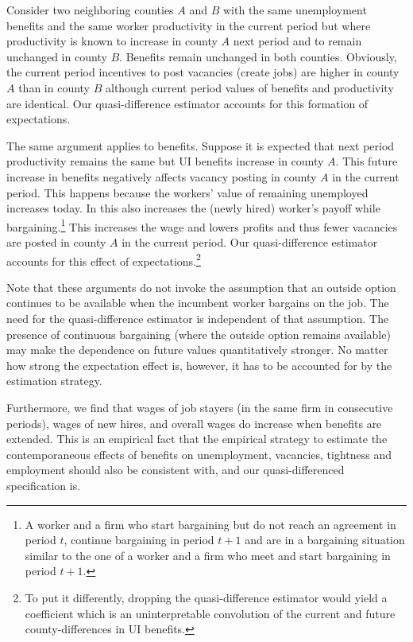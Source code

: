 \documentclass[12pt]{article}
\newcommand{\1}{\mathbf{1}}
\begin{document}
\begin{appendix}
Consider two neighboring counties $A$ and $B$ with the same unemployment benefits and the same worker productivity in the current period but where productivity is known to increase in county $A$ next period and to remain unchanged in county $B$. Benefits remain unchanged in both counties. Obviously, the current period incentives to post vacancies (create jobs) are higher in county $A$ than in county $B$ although current period values of benefits and productivity are identical. Our quasi-difference estimator accounts for this formation of expectations.

The same argument applies to benefits. Suppose it is expected that next period productivity remains the same but UI benefits increase in county $A$. This future increase in benefits negatively affects vacancy posting in county $A$ in the current period. This happens because the workers' value of remaining unemployed increases today. In \citet{hall+milgrom:08} this also increases the (newly hired) worker's payoff while bargaining.\footnote{A worker and a firm who start bargaining but do not reach an agreement in period $t$, continue bargaining in period $t+1$ and are in a bargaining situation similar to the one of a worker and a firm who meet and start bargaining in period $t+1$.}
This increases the wage and lowers profits and thus fewer vacancies are posted in county $A$ in the current period. Our quasi-difference estimator accounts for this effect of expectations.\footnote{To put it differently, dropping the quasi-difference estimator would yield a coefficient which is an uninterpretable convolution of the current and future county-differences in UI benefits.}

Note that these arguments do not invoke the assumption that an outside option continues to be available when the incumbent worker bargains on the job. The need for the quasi-difference estimator is independent of that assumption. The presence of continuous bargaining (where the outside option remains available) may make the dependence on future values quantitatively stronger. No matter how strong the expectation effect is, however, it has to be accounted for by the estimation strategy.

Furthermore, we find that wages of job stayers (in the same firm in consecutive periods), wages of new hires, and overall wages do increase when benefits are extended. This is an empirical fact that the empirical strategy to estimate the contemporaneous effects of benefits on unemployment, vacancies, tightness and employment should also be consistent with, and our quasi-differenced specification is.


\end{appendix}
\end{document}
